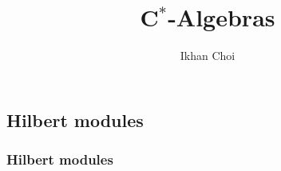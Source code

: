 \documentclass{../../large}
\begin{document}
\title{C$^*$-Algebras}
\author{Ikhan Choi}
\maketitle
\tableofcontents

\part{}



\chapter{Hilbert modules}

\section{Hilbert modules}
\end{document}
